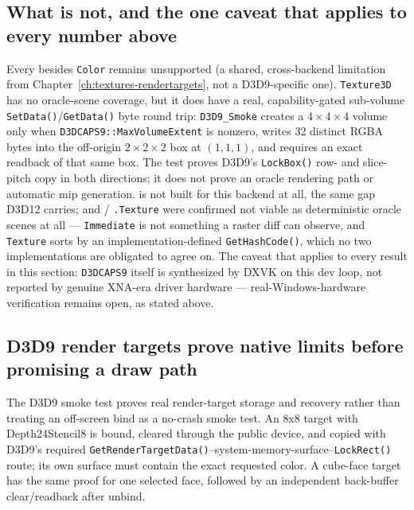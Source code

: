 \subsection{What is not, and the one caveat that applies to every number above}

Every  besides \texttt{Color} remains unsupported (a shared,
cross-backend limitation from Chapter~\ref{ch:textures-rendertargets}, not a D3D9-specific
one). \texttt{Texture3D} has no oracle-scene coverage, but it does have a real, capability-gated
sub-volume \texttt{SetData()}/\texttt{GetData()} byte round trip: \texttt{D3D9\_Smoke} creates a
\(4\times4\times4\) volume only when \texttt{D3DCAPS9::MaxVolumeExtent}
is nonzero, writes 32 distinct RGBA bytes into the off-origin \(2\times2\times2\) box at
\((1,1,1)\), and requires an exact readback of that same box. The test proves D3D9's
\texttt{LockBox()} row- and slice-pitch copy in both directions; it does not prove an oracle
rendering path or automatic mip generation.  is not
built for this backend at all, the same gap D3D12 carries; and
 / \texttt{.Texture} were confirmed not viable as
deterministic oracle scenes at all --- \texttt{Immediate} is not something a raster diff can
observe, and \texttt{Texture} sorts by an implementation-defined \texttt{GetHashCode()},
which no two implementations are obligated to agree on. The caveat that applies to every
result in this section: \texttt{D3DCAPS9} itself is synthesized by DXVK on this dev loop, not
reported by genuine XNA-era driver hardware --- real-Windows-hardware verification remains
open, as stated above.

\subsection{D3D9 render targets prove native limits before promising a draw path}

The D3D9 smoke test proves real render-target storage and recovery rather than treating an
off-screen bind as a no-crash smoke test. An 8x8 target with Depth24Stencil8 is bound, cleared
through the public device, and copied with D3D9's required
\texttt{GetRenderTargetData()}--system-memory-surface--\texttt{LockRect()} route; its own surface
must contain the exact requested color. A cube-face target has the same proof for one selected
face, followed by an independent back-buffer clear/readback after unbind.

